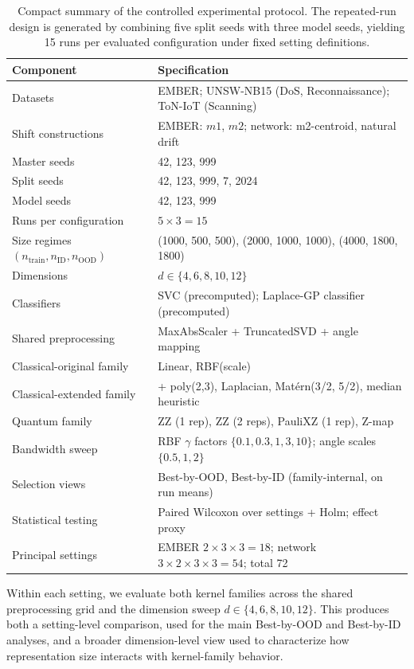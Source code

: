 \documentclass[journal]{IEEEtran}
\begin{document}
\begin{table}[!t]
\centering
\caption{Compact summary of the controlled experimental protocol. The repeated-run design is generated by combining five split seeds with three model seeds, yielding 15 runs per evaluated configuration under fixed setting definitions.}
\label{tab:protocol_summary}
\small
\setlength{\tabcolsep}{5pt}
\begin{tabular}{lp{7.6cm}}
\toprule
Component & Specification \\
\midrule
Datasets & EMBER; UNSW-NB15 (DoS, Reconnaissance); ToN-IoT (Scanning) \\
Shift constructions & EMBER: $m1$, $m2$; network: m2-centroid, natural drift \\
Master seeds & 42, 123, 999 \\
Split seeds & 42, 123, 999, 7, 2024 \\
Model seeds & 42, 123, 999 \\
Runs per configuration & $5 \times 3 = 15$ \\
Size regimes $(n_{\mathrm{train}}, n_{\mathrm{ID}}, n_{\mathrm{OOD}})$ & (1000, 500, 500), (2000, 1000, 1000), (4000, 1800, 1800) \\
Dimensions & $d \in \{4,6,8,10,12\}$ \\
Classifiers & SVC (precomputed); Laplace-GP classifier (precomputed) \\
Shared preprocessing & MaxAbsScaler + TruncatedSVD + angle mapping \\
Classical-original family & Linear, RBF(scale) \\
Classical-extended family & + poly(2,3), Laplacian, Mat\'ern(3/2, 5/2), median heuristic \\
Quantum family & ZZ (1 rep), ZZ (2 reps), PauliXZ (1 rep), Z-map \\
Bandwidth sweep & RBF $\gamma$ factors $\{0.1,0.3,1,3,10\}$; angle scales $\{0.5,1,2\}$ \\
Selection views & Best-by-OOD, Best-by-ID (family-internal, on run means) \\
Statistical testing & Paired Wilcoxon over settings + Holm; effect proxy \\
Principal settings & EMBER $2{\times}3{\times}3 = 18$; network $3{\times}2{\times}3{\times}3 = 54$; total 72 \\
\bottomrule
\end{tabular}
\end{table}

Within each setting, we evaluate both kernel families across the shared preprocessing grid and the dimension sweep $d \in \{4,6,8,10,12\}$. This produces both a setting-level comparison, used for the main Best-by-OOD and Best-by-ID analyses, and a broader dimension-level view used to characterize how representation size interacts with kernel-family behavior.
\end{document}
